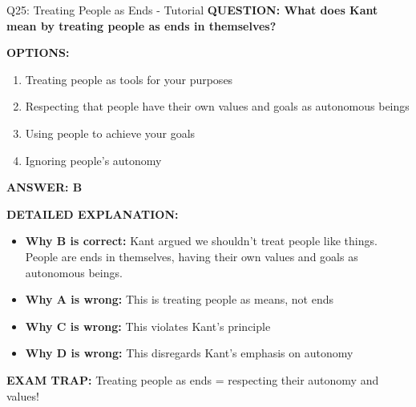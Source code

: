\documentclass[8pt]{beamer}
\begin{document}
	\begin{frame}{Q25: Treating People as Ends - Tutorial}
		\fontsize{6.5}{7.5}\selectfont
		\textbf{QUESTION: What does Kant mean by treating people as ends in themselves?}
		
		\vspace{0.1cm}
		\textbf{OPTIONS:}
		\begin{enumerate}
			\item Treating people as tools for your purposes
			\item Respecting that people have their own values and goals as autonomous beings
			\item Using people to achieve your goals
			\item Ignoring people's autonomy
		\end{enumerate}
		
		\vspace{0.1cm}
		\textcolor{myblue}{\textbf{ANSWER: B}}
		
		\vspace{0.1cm}
		\textbf{DETAILED EXPLANATION:}
		\begin{itemize}
			\item \textbf{Why B is correct:} Kant argued we shouldn't treat people like things. People are ends in themselves, having their own values and goals as autonomous beings.
			\item \textbf{Why A is wrong:} This is treating people as means, not ends
			\item \textbf{Why C is wrong:} This violates Kant's principle
			\item \textbf{Why D is wrong:} This disregards Kant's emphasis on autonomy
		\end{itemize}
		
		\textcolor{myred}{\textbf{EXAM TRAP:}} Treating people as ends = \textcolor{myblue}{respecting their autonomy and values}!
	\end{frame}
	
\end{document}
